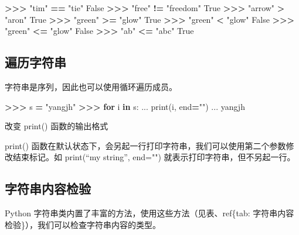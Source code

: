 \documentclass[]{ctexbook}
\newenvironment{Shaded}{\begin{snugshade}}{\end{snugshade}}
\newcommand{\BuiltInTok}[1]{#1}
\newcommand{\ControlFlowTok}[1]{\textcolor[rgb]{0.13,0.29,0.53}{\textbf{#1}}}
\newcommand{\KeywordTok}[1]{\textcolor[rgb]{0.13,0.29,0.53}{\textbf{#1}}}
\newcommand{\NormalTok}[1]{#1}
\newcommand{\OperatorTok}[1]{\textcolor[rgb]{0.81,0.36,0.00}{\textbf{#1}}}
\newcommand{\StringTok}[1]{\textcolor[rgb]{0.31,0.60,0.02}{#1}}
\newcommand{\VariableTok}[1]{\textcolor[rgb]{0.00,0.00,0.00}{#1}}
\begin{document}
\begin{Shaded}
\begin{Highlighting}[]
\OperatorTok{>>>} \StringTok{"tim"} \OperatorTok{==} \StringTok{"tie"}
\VariableTok{False}
\OperatorTok{>>>} \StringTok{"free"} \OperatorTok{!=} \StringTok{"freedom"}
\VariableTok{True}
\OperatorTok{>>>} \StringTok{"arrow"} \OperatorTok{>} \StringTok{"aron"}
\VariableTok{True}
\OperatorTok{>>>} \StringTok{"green"} \OperatorTok{>=} \StringTok{"glow"}
\VariableTok{True}
\OperatorTok{>>>} \StringTok{"green"} \OperatorTok{<} \StringTok{"glow"}
\VariableTok{False}
\OperatorTok{>>>} \StringTok{"green"} \OperatorTok{<=} \StringTok{"glow"}
\VariableTok{False}
\OperatorTok{>>>} \StringTok{"ab"} \OperatorTok{<=} \StringTok{"abc"}
\VariableTok{True}
\end{Highlighting}
\end{Shaded}

\hypertarget{ux904dux5386ux5b57ux7b26ux4e32}{%
\subsection{遍历字符串}\label{ux904dux5386ux5b57ux7b26ux4e32}}

字符串是序列，因此也可以使用循环遍历成员。

\begin{Shaded}
\begin{Highlighting}[]
\OperatorTok{>>>}\NormalTok{ s }\OperatorTok{=} \StringTok{"yangjh"}
\OperatorTok{>>>} \ControlFlowTok{for}\NormalTok{ i }\KeywordTok{in}\NormalTok{ s:}
\NormalTok{...     }\BuiltInTok{print}\NormalTok{(i, end}\OperatorTok{=}\StringTok{""}\NormalTok{)}
\NormalTok{...}
\NormalTok{yangjh}
\end{Highlighting}
\end{Shaded}

改变 print() 函数的输出格式

print() 函数在默认状态下，会另起一行打印字符串，我们可以使用第二个参数修改结束标记。如
print(``my string'', end="") 就表示打印字符串，但不另起一行。

\hypertarget{ux5b57ux7b26ux4e32ux5185ux5bb9ux68c0ux9a8c}{%
\subsection{字符串内容检验}\label{ux5b57ux7b26ux4e32ux5185ux5bb9ux68c0ux9a8c}}

Python 字符串类内置了丰富的方法，使用这些方法（见表、ref\{tab: 字符串内容检验\}），我们可以检查字符串内容的类型。
\end{document}
